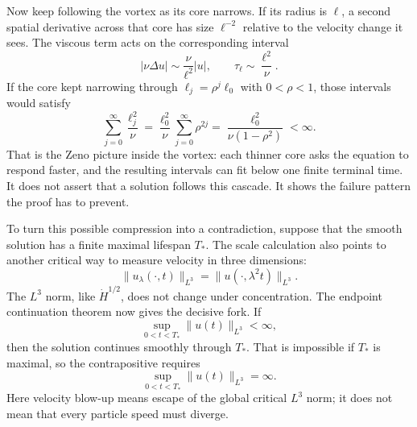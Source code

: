 Now keep following the vortex as its core narrows.  If its radius is
\(\ell\), a second spatial derivative across that core has size
\(\ell^{-2}\) relative to the velocity change it sees.  The viscous term acts
on the corresponding interval
\[
|\nu\Delta u|
\sim\frac{\nu}{\ell^2}|u|,
\qquad
\tau_\ell\sim\frac{\ell^2}{\nu}.
\]
If the core kept narrowing through
\(\ell_j=\rho^j\ell_0\) with \(0<\rho<1\), those intervals would satisfy
\[
\sum_{j=0}^{\infty}\frac{\ell_j^2}{\nu}
=\frac{\ell_0^2}{\nu}\sum_{j=0}^{\infty}\rho^{2j}
=\frac{\ell_0^2}{\nu(1-\rho^2)}<\infty.
\]
That is the Zeno picture inside the vortex: each thinner core asks the equation
to respond faster, and the resulting intervals can fit below one finite
terminal time.  It does not assert that a solution follows this cascade.  It
shows the failure pattern the proof has to prevent.

To turn this possible compression into a contradiction, suppose that the smooth
solution has a finite maximal lifespan \(T_*\).  The scale calculation also
points to another critical way to measure velocity in three dimensions:
\[
\|u_\lambda(\cdot,t)\|_{L^3}
=\|u(\cdot,\lambda^2t)\|_{L^3}.
\]
The \(L^3\) norm, like \(\dot H^{1/2}\), does not change under concentration.
The endpoint continuation theorem now gives the decisive fork.  If
\[
\sup_{0<t<T_*}\|u(t)\|_{L^3}<\infty,
\]
then the solution continues smoothly through \(T_*\).  That is impossible if
\(T_*\) is maximal, so the contrapositive requires
\[
\sup_{0<t<T_*}\|u(t)\|_{L^3}=\infty.
\]
Here velocity blow-up means escape of the global critical \(L^3\) norm; it
does not mean that every particle speed must diverge.

